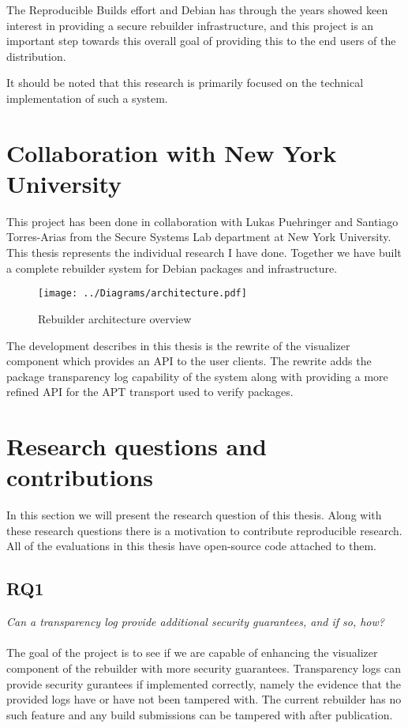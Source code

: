 \documentclass[../Main/thesis.tex]{subfiles}
\begin{document}
The Reproducible Builds effort and Debian has through the years showed keen
interest in providing a secure rebuilder infrastructure, and this project is
an important step towards this overall goal of providing this to the end users
of the distribution.

It should be noted that this research is primarily focused on the technical
implementation of such a system.

\section{Collaboration with New York University}\label{sec:collab}
This project has been done in collaboration with Lukas Puehringer and Santiago
Torres-Arias from the Secure Systems Lab department at New York University. This
thesis represents the individual research I have done. Together we have built a
complete rebuilder system for Debian packages and infrastructure. 

\begin{figure}[H]
\centering
\texttt{[image: ../Diagrams/architecture.pdf]}
\caption{Rebuilder architecture overview}
\label{fig:rebuilder_architecture}
\end{figure}

The development describes in this thesis is the rewrite of the visualizer
component which provides an API to the user clients. The rewrite adds the
package transparency log capability of the system along with providing a more
refined API for the APT transport used to verify packages.

\section{Research questions and contributions}\label{sec:rq}
In this section we will present the research question of this thesis.  Along
with these research questions there is a motivation to contribute reproducible
research. All of the evaluations in this thesis have open-source code attached
to them.

\subsection*{RQ1}%
\label{sub:rq1}
\textit{Can a transparency log provide additional security guarantees, and if so, how?}
\\\\
The goal of the project is to see if we are capable of enhancing the visualizer
component of the rebuilder with more security guarantees. Transparency logs can
provide security gurantees if implemented correctly, namely the evidence that
the provided logs have or have not been tampered with. The current rebuilder
has no such feature and any build submissions can be tampered with after
publication.
\end{document}
